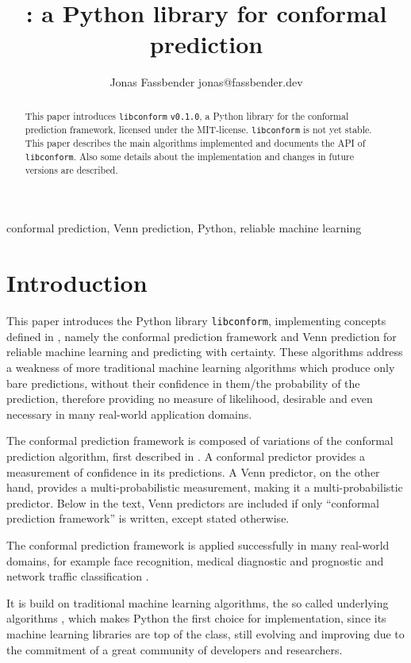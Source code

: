 \documentclass[twoside,11pt]{article}
\title{\libconform{} \version: a Python library for
       conformal prediction}
\author{\name Jonas Fassbender
        \email jonas@fassbender.dev}
\def\version{\texttt{v0.1.0}}
\def\libconform{\texttt{libconform}}
\begin{document}
\maketitle

\begin{abstract}%
This paper introduces \libconform{} \version{}, a Python
library for the conformal prediction framework, licensed
under the MIT-license.
\libconform{} is not yet stable.
This paper describes the main algorithms implemented and
documents the API of \libconform{}.
Also some details about the implementation and changes in
future versions are described.
\end{abstract}

\begin{keywords}
conformal prediction, Venn prediction, Python,
reliable machine learning
\end{keywords}


\section{Introduction}

This paper introduces the Python library \libconform,
implementing concepts defined in \citet{alrw}, namely the
conformal prediction framework and Venn prediction for
reliable machine learning and predicting with certainty.
These algorithms address a weakness of more traditional
machine learning algorithms which produce only bare
predictions, without their confidence in them/the
probability of the prediction, therefore providing no
measure of likelihood, desirable and even necessary in many
real-world application domains.

The conformal prediction framework is composed of
variations of the conformal prediction algorithm,
first described in
\citet{vovk_et_al_1999, saunders_et_al_1999}.
A conformal predictor provides a measurement of confidence
in its predictions.
A Venn predictor, on the other hand, provides a
multi-probabilistic measurement, making it a
multi-probabilistic predictor.
Below in the text, Venn predictors are included if only
``conformal prediction framework'' is written, except
stated otherwise.

The conformal prediction framework is applied successfully
in many real-world domains, for example face recognition,
medical diagnostic and prognostic and network traffic
classification \citep[see][Part 3]{cprml}.

It is build on traditional machine learning algorithms, the
so called underlying algorithms
\citep[see][]{papadopoulos_et_al_2007}, which makes Python
the first choice for implementation, since its machine
learning libraries are top of the class, still evolving and
improving due to the commitment of a great community of
developers and researchers.
\end{document}
